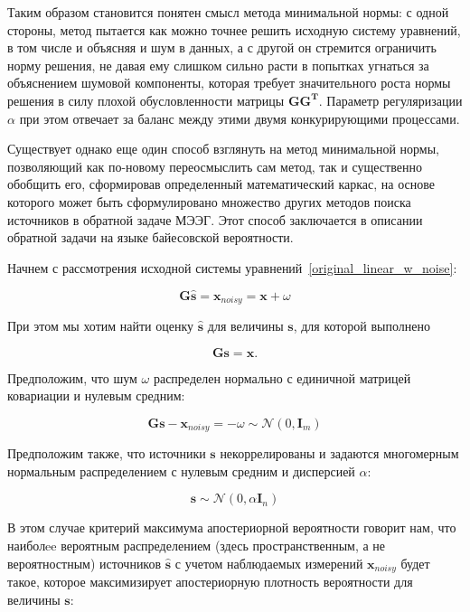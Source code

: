 Таким образом становится понятен смысл метода минимальной нормы: с одной
стороны, метод пытается как можно точнее решить исходную систему уравнений, в
том числе и объясняя и шум в данных, а с другой он стремится ограничить норму
решения, не давая ему слишком сильно расти в попытках угнаться за объяснением
шумовой компоненты, которая требует значительного роста нормы решения в силу
плохой обусловленности матрицы $\mathbf{GG^T}$. Параметр регуляризации $\alpha$
при этом отвечает за баланс между этими двумя конкурирующими процессами.

Существует однако еще один способ взглянуть на метод минимальной нормы,
позволяющий как по-новому переосмыслить сам метод, так и существенно обобщить
его, сформировав определенный математический каркас, на основе которого
может быть сформулировано множество других методов поиска источников
в обратной задаче МЭЭГ. Этот способ заключается в описании обратной задачи
на языке байесовской вероятности.

Начнем с рассмотрения исходной системы уравнений~\ref{original_linear_w_noise}:

\begin{equation}
    \mathbf{G\hat{s}} = \mathbf{x}_{noisy} = \mathbf{x} + \omega
\end{equation}

При этом мы хотим найти оценку $\mathbf{\hat{s}}$ для величины $\mathbf{s}$,
для которой выполнено

\begin{equation}
    \mathbf{Gs} = \mathbf{x}.
\end{equation}

Предположим, что шум $\omega$ распределен нормально с единичной
матрицей ковариации и нулевым средним:

\begin{equation}
    \mathbf{Gs - x}_{noisy} = -\omega \sim \mathcal{N}(0, \mathbf{I}_m)
\end{equation}

Предположим также, что источники $\mathbf{s}$ некоррелированы и задаются
многомерным нормальным распределением с нулевым средним и дисперсией $\alpha$:

\begin{equation}
    \mathbf{s} \sim \mathcal{N}(0, \alpha\mathbf{I}_n)
\end{equation}

В этом случае критерий максимума апостериорной вероятности говорит нам, что
наиболee вероятным распределением (здесь пространственным, а не вероятностным)
источников $\mathbf{\hat{s}}$ с учетом наблюдаемых измерений
$\mathbf{x}_{noisy}$ будет такое, которое максимизирует апостериорную
плотность вероятности для величины $\mathbf{s}$:

